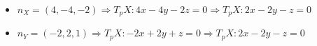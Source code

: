 \documentclass[../main.tex]{subfiles}
\begin{document}
\begin{solucao}
			\begin{itemize}
				\item $n_X=(4,-4,-2)\Rightarrow T_pX\colon 4x-4y-2z=0 \Rightarrow T_pX\colon 2x-2y-z=0$
				\item $n_Y=(-2,2,1)\Rightarrow T_pX\colon -2x+2y+z=0 \Rightarrow T_pX\colon 2x-2y-z=0$
			\end{itemize}
		\end{solucao}
	
\end{document}
